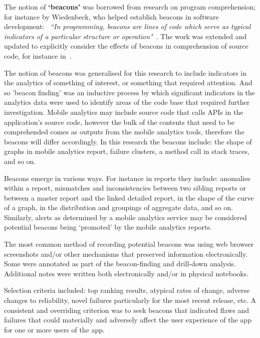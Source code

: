 The notion of \textbf{`beacons'} was borrowed from research on program comprehension; for instance by Wiedenbeck, who helped establish beacons in software development: ~\emph{``In programming, beacons are lines of code which serve as typical indicators of a particular structure or operation"}~\citep[p.679]{WIEDENBECK1986_beacons_in_computer_program_comprehension}. The work was extended and updated to explicitly consider the effects of beacons in comprehension of source code, for instance in~\citealt{crosby2002_roles_beacons_play_in_comprehension_etc}.

The notion of beacons was generalised for this research to include indicators in the analytics of something of interest, or something that required attention.  And so 'beacon finding' was an inductive process by which significant indicators in the analytics data were used to identify areas of the code base that required further investigation.  Mobile analytics may include source code that calls APIs in the application's source code, however the bulk of the contents that need to be comprehended comes as outputs from the mobile analytics tools, therefore the beacons will differ accordingly. In this research the beacons include: the shape of graphs in mobile analytics report, failure clusters, a method call in stack traces, and so on.


Beacons emerge in various ways. For instance in reports they include: anomalies within a report, mismatches and inconsistencies between two sibling reports or between a master report and the linked detailed report, in the shape of the curve of a graph, in the distribution and groupings of aggregate data, and so on. Similarly, alerts as determined by a mobile analytics service may be considered potential beacons being `promoted' by the mobile analytics reports. 

The most common method of recording potential beacons was using web browser screenshots and/or other mechanisms that preserved information electronically. Some were annotated as part of the beacon-finding and drill-down analysis. Additional notes were written both electronically and/or in physical notebooks. 

Selection criteria included: top ranking results, atypical rates of change, adverse changes to reliability, novel failures particularly for the most recent release, etc. A consistent and overriding criterion was to seek beacons that indicated flaws and failures that could materially and adversely affect the user experience of the app for one or more users of the app.

